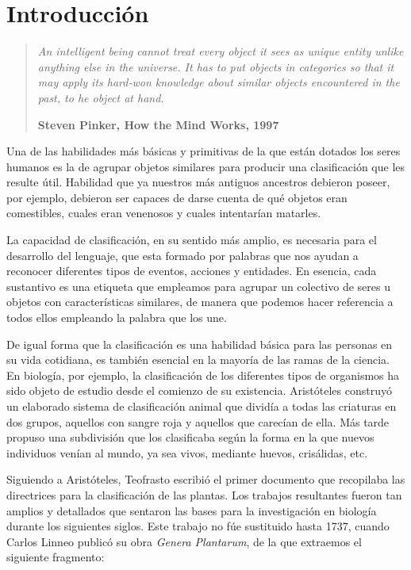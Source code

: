 
\chapter{Introducción}\label{ch:introduccion}

\begin{quotation}{\slshape
		An intelligent being cannot treat every object it sees as unique entity unlike anything else in the universe. It has to put objects in categories so that it may apply its hard-won knowledge about similar objects encountered in the past, to he object at hand.}
		\begin{flushright}
			\textbf{Steven Pinker, How the Mind Works, 1997} 
		\end{flushright}
\end{quotation}

Una de las habilidades más básicas y primitivas de la que están dotados los seres humanos es la de agrupar objetos similares para producir una clasificación que les resulte útil. Habilidad que ya nuestros más antiguos ancestros debieron poseer, por ejemplo, debieron ser capaces de darse cuenta de qué objetos eran comestibles, cuales eran venenosos y cuales intentarían matarles.

La capacidad de clasificación, en su sentido más amplio, es necesaria para el desarrollo del lenguaje, que esta formado por palabras que nos ayudan a reconocer diferentes tipos de eventos, acciones y entidades. En esencia, cada sustantivo es una etiqueta que empleamos para agrupar un colectivo de seres u objetos con características similares, de manera que podemos hacer referencia a todos ellos empleando la palabra que los une.

De igual forma que la clasificación es una habilidad básica para las personas en su vida cotidiana, es también esencial en la mayoría de las ramas de la ciencia. En biología, por ejemplo, la clasificación de los diferentes tipos de organismos ha sido objeto de estudio desde el comienzo de su existencia. Aristóteles construyó un elaborado sistema de clasificación animal que dividía a todas las criaturas en dos grupos, aquellos con sangre roja y aquellos que carecían de ella. Más tarde propuso una subdivisión que los clasificaba según la forma en la que nuevos individuos venían al mundo, ya sea vivos, mediante huevos, crisálidas, etc.

Siguiendo a Aristóteles, Teofrasto escribió el primer documento que recopilaba las directrices para la clasificación de las plantas. Los trabajos resultantes fueron tan amplios y detallados que sentaron las bases para la investigación en biología durante los siguientes siglos. Este trabajo no fúe sustituido hasta 1737, cuando Carlos Linneo publicó su obra \textit{Genera Plantarum}, de la que extraemos el siguiente fragmento:

